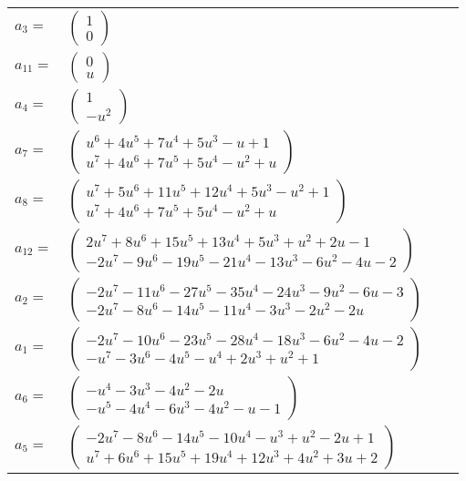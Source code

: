 \documentclass[1p]{elsarticle_modified}
\theoremstyle{definition}
\begin{document}
\begin{tabular}{m{7pt} m{180pt} m{7pt} m{180pt} }
\flushright $a_{3}=$&$\begin{pmatrix}1\\0\end{pmatrix}$ \\
\flushright $a_{11}=$&$\begin{pmatrix}0\\u\end{pmatrix}$ \\
\flushright $a_{4}=$&$\begin{pmatrix}1\\- u^2\end{pmatrix}$ \\
\flushright $a_{7}=$&$\begin{pmatrix}u^6+4 u^5+7 u^4+5 u^3- u+1\\u^7+4 u^6+7 u^5+5 u^4- u^2+u\end{pmatrix}$ \\
\flushright $a_{8}=$&$\begin{pmatrix}u^7+5 u^6+11 u^5+12 u^4+5 u^3- u^2+1\\u^7+4 u^6+7 u^5+5 u^4- u^2+u\end{pmatrix}$ \\
\flushright $a_{12}=$&$\begin{pmatrix}2 u^7+8 u^6+15 u^5+13 u^4+5 u^3+u^2+2 u-1\\-2 u^7-9 u^6-19 u^5-21 u^4-13 u^3-6 u^2-4 u-2\end{pmatrix}$ \\
\flushright $a_{2}=$&$\begin{pmatrix}-2 u^7-11 u^6-27 u^5-35 u^4-24 u^3-9 u^2-6 u-3\\-2 u^7-8 u^6-14 u^5-11 u^4-3 u^3-2 u^2-2 u\end{pmatrix}$ \\
\flushright $a_{1}=$&$\begin{pmatrix}-2 u^7-10 u^6-23 u^5-28 u^4-18 u^3-6 u^2-4 u-2\\- u^7-3 u^6-4 u^5- u^4+2 u^3+u^2+1\end{pmatrix}$ \\
\flushright $a_{6}=$&$\begin{pmatrix}- u^4-3 u^3-4 u^2-2 u\\- u^5-4 u^4-6 u^3-4 u^2- u-1\end{pmatrix}$ \\
\flushright $a_{5}=$&$\begin{pmatrix}-2 u^7-8 u^6-14 u^5-10 u^4- u^3+u^2-2 u+1\\u^7+6 u^6+15 u^5+19 u^4+12 u^3+4 u^2+3 u+2\end{pmatrix}$ \\

\end{tabular}
\end{document}
